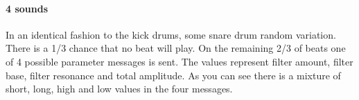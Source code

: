\paragraph{4 sounds}
In an identical fashion to the kick drums, some
snare drum random variation. There is a 1/3 chance that no
beat will play. On the remaining 2/3 of beats one of 4 possible
parameter messages is sent. The values represent filter amount,
filter base, filter resonance and total amplitude. As you
can see there is a mixture of short, long, high and low values
in the four messages.



